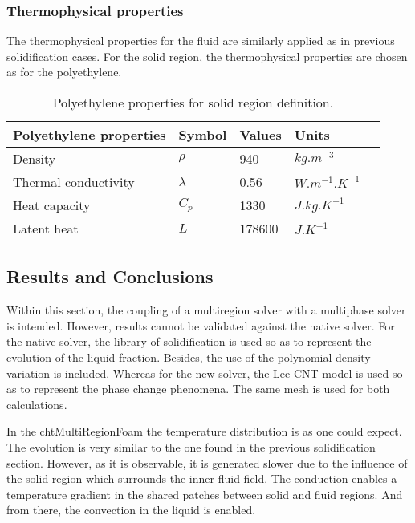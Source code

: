 \subsubsection{Thermophysical properties}

\setlength{\parindent}{0.5cm} The thermophysical properties for the fluid are similarly applied as in previous solidification cases.
For the solid region, the thermophysical properties are chosen as for the polyethylene.

\begin{table}[h!]
	\begin{tabular}{@{}lllll@{}}
		\toprule[1pt]
		\textbf{Polyethylene properties} & \textbf{Symbol} & \textbf{Values} & \textbf{Units} &  \\ \midrule[2pt]
		Density & $\rho$ & 940 & $kg.m^{-3}$ \\	
		Thermal conductivity & $\lambda$ & 0.56 & $W.m^{-1}.K^{-1}$ \\		
		Heat capacity & $C_{p}$ & 1330 & $J.kg.K^{-1}$ \\		 
		Latent heat & $L$ &  178600  & $J.K^{-1}$ \\		 \bottomrule[1pt]		
	\end{tabular}
	\centering
	\caption{Polyethylene properties for solid region definition.}	
	\label{4.3tab}
\end{table}
\clearpage
\subsection{Results and Conclusions}
Within this section, the coupling of a multiregion solver with a multiphase solver is intended. However, results cannot be validated against the native solver.
For the native solver, the library of solidification is used so as to represent the evolution of the liquid fraction. Besides, the use of the polynomial density variation is included. Whereas for the new solver, the Lee-CNT model is used so as to represent the phase change phenomena. The same mesh is used for both calculations. 

\noindent In the chtMultiRegionFoam the temperature distribution is as one could expect. The evolution is very similar to the one found in the previous solidification section. However, as it is observable, it is generated slower due to the influence of the solid region which surrounds the inner fluid field. The conduction enables a temperature gradient in the shared patches between solid and fluid regions. And from there, the convection in the liquid is enabled. 

